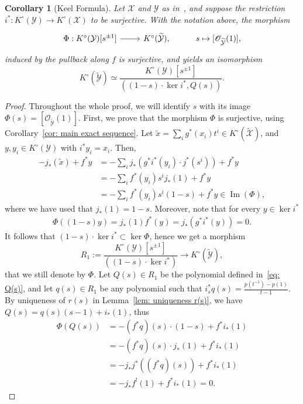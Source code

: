 \documentclass[12pt]{amsart}
\newcommand{\sO}{\mathscr{O}}
\newcommand{\cX}{\mathcal{X}}
\newcommand{\cY}{\mathcal{Y}}
\newcommand{\tcY}{\widetilde{\mathcal{Y}}}
\newcommand{\tcX}{\widetilde{\mathcal{X}}}
\newcommand{\Kring}{K^{\circ}}
\newtheorem{Corollary}[theorem]{Corollary}
\theoremstyle{definition}
\begin{document}
\begin{Corollary}[Keel Formula]\label{cor: keel formula}
    Let $\cX$ and $\cY$ as in~, and suppose the restriction $i^*:\Kring(\cY)\rightarrow\Kring(\cX)$ to be surjective. With the notation above, the morphism
    \[
    \begin{tikzcd}
        \Phi:\Kring(\cY)[s^{\pm1}]\arrow[r] & \Kring(\tcY), & s\mapsto {[\sO_{\tcY}(1)]},
    \end{tikzcd}
    \]
    induced by the pullback along $f$ is surjective, and yields an isomorphism
    \[
        \Kring(\tcY)\simeq\frac{\Kring(\cY)[s^{\pm1}]}{((1-s)\cdot\ker i^*,Q(s))}.
    \]
\end{Corollary}
\begin{proof}
    Throughout the whole proof, we will identify $s$ with its image $\Phi(s)=[\sO_{\tcY}(1)]$.
    First, we prove that the morphism $\Phi$ is surjective, using Corollary~\ref{cor: main exact sequence}. Let $\widetilde{x}=\sum_i g^*(x_i)t^i\in\Kring(\tcX)$, and $y,y_i\in\Kring(\cY)$ with $i^*y_i=x_i$. Then,
    \begin{align*}
        -j_*(\widetilde{x})+f^*y &= -\sum_i j_*(g^*i^*(y_i)\cdot j^*(s^i))+f^*y\\
        &= -\sum_i f^*(y_i)s^ij_*(1)+f^*y\\
        &= -\sum_i f^*(y_i)s^i(1-s)+f^*y\in\operatorname{Im}(\Phi),
    \end{align*}
    where we have used that $j_*(1)=1-s$. Moreover, note that for every $y\in\ker i^*$
    \begin{align*}
        \Phi((1-s)y)=j_*(1)f^*(y)=j_*(g^*i^*(y))=0.
    \end{align*}
    It follows that $(1-s)\cdot\ker i^*\subset\ker\Phi$, hence we get a morphism
    \[
        R_1:=\frac{\Kring(\cY)[s^{\pm1}]}{((1-s)\cdot\ker i^*)}\longrightarrow\Kring(\tcY),
    \]
    that we still denote by $\Phi$. Let $Q(s)\in R_1$ be the polynomial defined in~\eqref{eq: Q(s)}, and let $q(s)\in R_1$ be any polynomial such that $i_s^*q(s)=\frac{p(t^{-1})-p(1)}{t-1}$. By uniqueness of $r(s)$ in Lemma~\ref{lem: uniqueness r(s)}, we have $Q(s)=q(s)(s-1)+i_*(1)$, thus
    \begin{align*}
        \Phi(Q(s))&=-(f^*q)(s)\cdot(1-s)+f^*i_*(1)\\
        &=-(f^*q)(s)\cdot j_*(1)+f^*i_*(1)\\
        &=-j_*j^*((f^*q)(s))+f^*i_*(1)\\
        &=-j_*f^!(1)+f^*i_*(1)=0.
    \end{align*}

\end{proof}
\end{document}
